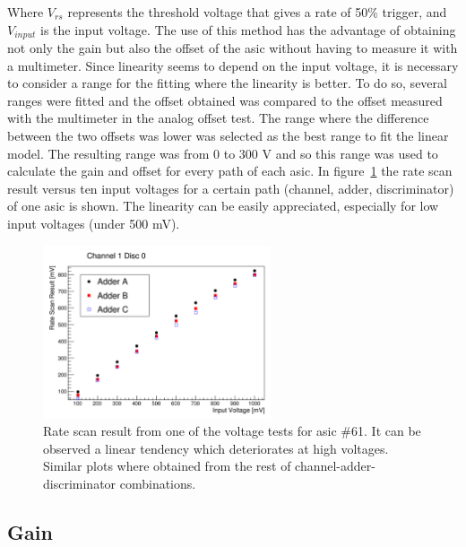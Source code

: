 \documentclass[main.tex]{subfiles}
\begin{document}
Where $V_{rs}$ represents the threshold voltage that gives a rate of 50\% trigger, and $V_{input}$ is the input voltage. The use of this method has the advantage of obtaining not only the gain but also the offset of the \gls{asic} without having to measure it with a multimeter. Since linearity seems to depend on the input voltage, it is necessary to consider a range for the fitting where the linearity is better. To do so, several ranges were fitted and the offset obtained was compared to the offset measured with the multimeter in the analog offset test. The range where the difference between the two offsets was lower was selected as the best range to fit the linear model. The resulting range was from 0 to 300 V and so this range was used to calculate the gain and offset for every path of each \gls{asic}.
In figure~\ref{fig:linearfit} the rate scan result versus ten input voltages for a certain path (channel, adder, discriminator) of one \gls{asic} is shown. The linearity can be easily appreciated, especially for low input voltages (under 500 mV).

\begin{figure}[h]
  \centering
  \includegraphics[width=0.6\textwidth]{./Pictures/linearfit.pdf}
  \caption{Rate scan result from one of the voltage tests for \gls{asic} \#61. It can be observed a linear tendency which deteriorates at high voltages.
    Similar plots where obtained from the rest of channel-adder-discriminator combinations. }
  \label{fig:linearfit}
\end{figure}

\subsection{Gain}
\end{document}
